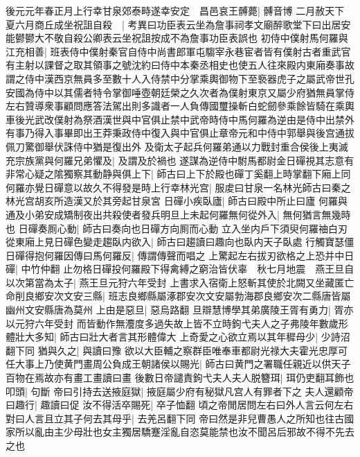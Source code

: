 後元元年春正月上行幸甘泉郊泰畤遂幸安定　昌邑哀王髆薨|{
	髆音博}
二月赦天下　夏六月商丘成坐祝詛自殺　|{
	考異曰功臣表云坐為詹事祠孝文廟醉歌堂下曰出居安能鬰鬰大不敬自殺公卿表云坐祝詛按成不為詹事功臣表誤也}
初侍中僕射馬何羅與江充相善|{
	班表侍中僕射秦官自侍中尚書郎軍屯騶宰永巷宦者皆有僕射古者重武官有主射以課督之取其領事之號沈約曰侍中本秦丞相史也使五人往來殿内東廂奏事故謂之侍中漢西京無員多至數十人入侍禁中分掌乘輿御物下至䙝器虎子之屬武帝世孔安國為侍中以其儒者特令掌御唾壺朝廷榮之久次者為僕射東京又屬少府猶無員掌侍左右贊導衆事顧問應答法駕出則多識者一人負傳國璽操斬白蛇劒參乘餘皆騎在乘輿車後光武改僕射為祭酒漢世與中官俱止禁中武帝時侍中馬何羅為逆由是侍中出禁外有事乃得入事畢即出王莽秉政侍中復入與中官俱止章帝元和中侍中郭舉與後宫通拔佩刀驚御舉伏誅侍中猶是復出外}
及衛太子起兵何羅弟通以力戰封重合侯後上夷滅充宗族黨與何羅兄弟懼及|{
	及謂及於禍也}
遂謀為逆侍中駙馬都尉金日磾視其志意有非常心疑之隂獨察其動静與俱上下|{
	師古曰上下於殿也磾丁奚翻上時掌翻下廂上同}
何羅亦覺日磾意以故久不得發是時上行幸林光宫|{
	服䖍曰甘泉一名林光師古曰秦之林光宫胡亥所造漢又於其旁起甘泉宮}
日磾小疾臥廬|{
	師古曰殿中所止曰廬}
何羅與通及小弟安成矯制夜出共殺使者發兵明旦上未起何羅無何從外入|{
	無何猶言無幾時也}
日磾奏厠心動|{
	師古曰奏向也日磾方向厠而心動}
立入坐内戶下須臾何羅䄂白刃從東廂上見日磾色變走趨臥内欲入|{
	師古曰趨讀曰趣向也臥内天子臥處}
行觸寶瑟僵日磾得抱何羅因傳曰馬何羅反|{
	傳謂傳聲而唱之}
上驚起左右拔刃欲格之上恐并中日磾|{
	中竹仲翻}
止勿格日磾投何羅殿下得禽縛之窮治皆伏辜　秋七月地震　燕王旦自以次第當為太子|{
	燕王旦元狩六年受封}
上書求入宿衛上怒斬其使於北闕又坐藏匿亡命削良鄉安次文安三縣|{
	班志良鄉縣屬涿郡安次文安屬勃海郡良鄉安次二縣唐皆屬幽州文安縣唐為莫州}
上由是惡旦|{
	惡烏路翻}
旦辯慧博學其弟廣陵王胥有勇力|{
	胥亦以元狩六年受封}
而皆動作無灋度多過失故上皆不立時鉤弋夫人之子弗陵年數歲形體壯大多知|{
	師古曰壯大者言其形體偉大}
上奇愛之心欲立焉以其年穉母少|{
	少詩沼翻下同}
猶與久之|{
	與讀曰豫}
欲以大臣輔之察群臣唯奉車都尉光禄大夫霍光忠厚可任大事上乃使黄門畫周公負成王朝諸侯以賜光|{
	師古曰黄門之署職任親近以供天子百物在焉故亦有畫工畫讀曰畫}
後數日帝譴責鉤弋夫人夫人脱簪珥|{
	珥仍吏翻耳飾也}
叩頭|{
	句斷}
帝曰引持去送掖庭獄|{
	掖庭屬少府有秘獄凡宫人有罪者下之}
夫人還顧帝曰趣行|{
	趣讀曰促}
汝不得活卒賜死|{
	卒子恤翻}
頃之帝閒居問左右曰外人言云何左右對曰人言且立其子何去其母乎|{
	去羌呂翻下同}
帝曰然是非兒曹愚人之所知也往古國家所以亂由主少母壯也女主獨居驕蹇淫亂自恣莫能禁也汝不聞呂后邪故不得不先去之也

